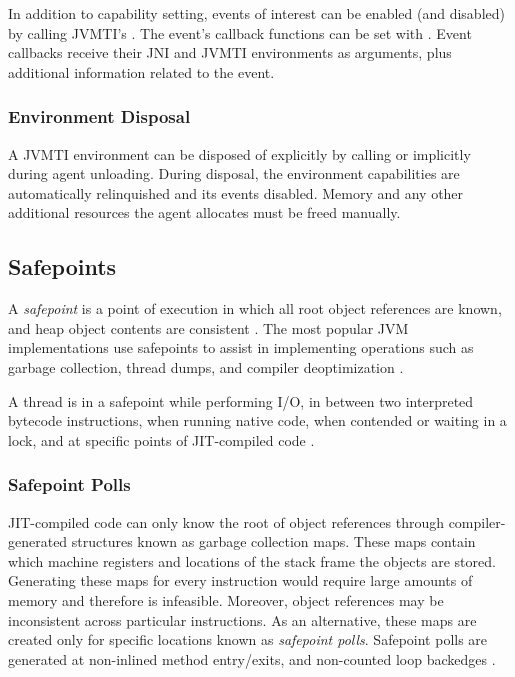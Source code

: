 In addition to capability setting, events of interest can be enabled (and disabled) by calling JVMTI's . The event's callback functions can be set with . Event callbacks receive their JNI and JVMTI environments as arguments, plus additional information related to the event.

\subsubsection*{Environment Disposal}

A JVMTI environment can be disposed of explicitly by calling  or implicitly during agent unloading. During disposal, the environment capabilities are automatically relinquished and its events disabled. Memory and any other additional resources the agent allocates must be freed manually.



\subsection{Safepoints}

A \emph{safepoint} is a point of execution in which all root object references are known, and heap object contents are consistent \cite{hotspotglossary}. The most popular JVM implementations use safepoints to assist in implementing operations such as garbage collection, thread dumps, and compiler deoptimization \cite{lin2015yieldpoint}.

A thread is in a safepoint while performing I/O, in between two interpreted bytecode instructions, when running native code, when contended or waiting in a lock, and at specific points of JIT-compiled code \cite{wakart2015safepoints}.

\subsubsection*{Safepoint Polls}

JIT-compiled code can only know the root of object references through compiler-generated structures known as garbage collection maps. These maps contain which machine registers and locations of the stack frame the objects are stored. Generating these maps for every instruction would require large amounts of memory and therefore is infeasible. Moreover, object references may be inconsistent across particular instructions. As an alternative, these maps are created only for specific locations known as \emph{safepoint polls}. Safepoint polls are generated at non-inlined method entry/exits, and non-counted loop backedges \cite{hohenseehotspot}.

